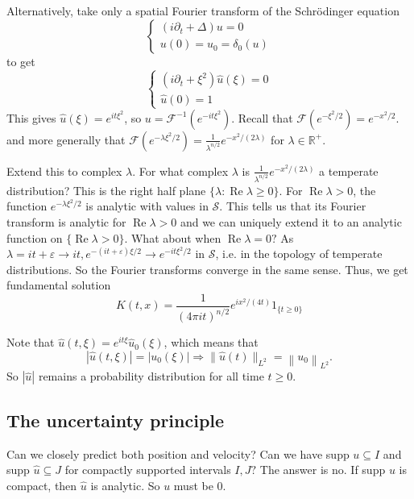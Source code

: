 Alternatively, take only a spatial Fourier transform of the Schrödinger equation
$$
\left\{\begin{array}{l}
\left(i \partial_{t}+\Delta\right) u=0 \\
u(0)=u_{0}=\delta_{0}(u)
\end{array}\right.
$$
to get
$$
\left\{\begin{array}{l}
\left(i \partial_{t}+\xi^{2}\right) \widehat{u}(\xi)=0 \\
\widehat{u}(0)=1
\end{array}\right.
$$
This gives $\widehat{u}(\xi)=e^{i t \xi^{2}}$, so $u=\mathcal{F}^{-1}\left(e^{-i t \xi^{2}}\right)$. Recall that $\mathcal{F}(e^{-\xi^{2} / 2})=e^{-x^{2} / 2}.$ and more generally that $\mathcal{F} (e^{-\lambda \xi^{2} / 2})=\frac{1}{\lambda^{n / 2}} e^{-x^{2} /(2 \lambda)}$ for $\lambda \in \mathbb{R}^{+}$.

Extend this to complex $\lambda .$ For what complex $\lambda$ is $\frac{1}{\lambda^{n / 2}} e^{-x^{2} /(2 \lambda)}$ a temperate distribution? This is the right half plane $\{\lambda: \operatorname{Re} \lambda \geq 0\} .$ For $\operatorname{Re} \lambda>0$, the function $e^{-\lambda \xi^{2} / 2}$ is analytic with values in $\mathcal{S}$. This tells us that its Fourier transform is analytic for $\operatorname{Re} \lambda>0$ and we can uniquely extend it to an analytic function on $\{\operatorname{Re} \lambda>0\}$. What about when $\operatorname{Re} \lambda=0 ?$ As $\lambda=i t+\varepsilon \rightarrow i t, e^{-(i t+\varepsilon) \xi / 2} \rightarrow e^{-i t \xi^{2} / 2}$ in $\mathcal{S}$, i.e. in the topology of temperate distributions. So the Fourier transforms converge in the same sense. Thus, we get fundamental solution
$$
K(t, x)=\frac{1}{(4 \pi i t)^{n / 2}} e^{i x^{2} /(4 t)} 1_{\{t \geq 0\}}
$$

\begin{remark}
    Note that $\widehat{u}(t, \xi)=e^{i t \xi} \widehat{u}_{0}(\xi)$, which means that
$$
|\widehat{u}(t, \xi)|=\left|u_{0}(\xi)\right| \Longrightarrow\|\widehat{u}(t)\|_{L^{2}}=\left\|u_{0}\right\|_{L^{2}} .
$$
So $|\widehat{u}|$ remains a probability distribution for all time $t \geq 0$.
\end{remark}

\subsection{The uncertainty principle}
Can we closely predict both position and velocity? Can we have supp $u \subseteq I$ and supp $\widehat{u} \subseteq J$ for compactly supported intervals $I, J ?$ The answer is no. If supp $u$ is compact, then $\widehat{u}$ is analytic. So $u$ must be 0.

